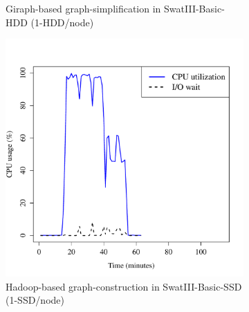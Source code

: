 \documentclass[conference]{IEEEtran}
\begin{document}
\begin{figure}[htb]
\begin{subfigure}[b]{0.23\textwidth}
                \caption{Giraph-based graph-simplification in SwatIII-Basic-HDD (1-HDD/node)}
                \label{fig:ECCPUHDD}
        \end{subfigure} 
        \begin{subfigure}[b]{0.23\textwidth}
                \includegraphics[width=\textwidth]{Figure/SystemData/Plots/BGCPUSSD.pdf}
                \caption{Hadoop-based graph-construction in SwatIII-Basic-SSD (1-SSD/node)}
                \label{fig:BGCPUSSD}
        \end{subfigure}    
        \begin{subfigure}[b]{0.23\textwidth}

\end{subfigure}
\end{figure}
\end{document}
